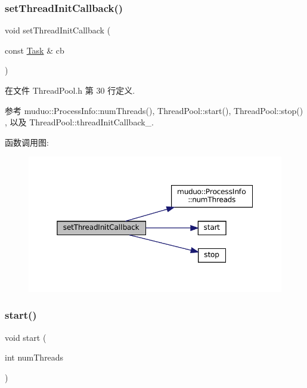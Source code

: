 \subsubsection{\texorpdfstring{set\+Thread\+Init\+Callback()}{setThreadInitCallback()}}
{\footnotesize\ttfamily void set\+Thread\+Init\+Callback (\begin{DoxyParamCaption}\item[{const \hyperlink{classmuduo_1_1ThreadPool_a46c264006febdf6c5dae5921d59c18d2}{Task} \&}]{cb }\end{DoxyParamCaption})\hspace{0.3cm}{\ttfamily [inline]}}



在文件 Thread\+Pool.\+h 第 30 行定义.



参考 muduo\+::\+Process\+Info\+::num\+Threads(), Thread\+Pool\+::start(), Thread\+Pool\+::stop() , 以及 Thread\+Pool\+::thread\+Init\+Callback\+\_\+.

函数调用图\+:
\nopagebreak
\begin{figure}[H]
\begin{center}
\leavevmode
\includegraphics[width=350pt]{classmuduo_1_1ThreadPool_a4e2a4c84ffbb1dddd012ee464aa75007_cgraph}
\end{center}
\end{figure}
\mbox{\label{classmuduo_1_1ThreadPool_a8fd9dd10347539b445bb28ce204d0c2d}} 
\subsubsection{\texorpdfstring{start()}{start()}}
{\footnotesize\ttfamily void start (\begin{DoxyParamCaption}\item[{int}]{num\+Threads }\end{DoxyParamCaption})}




